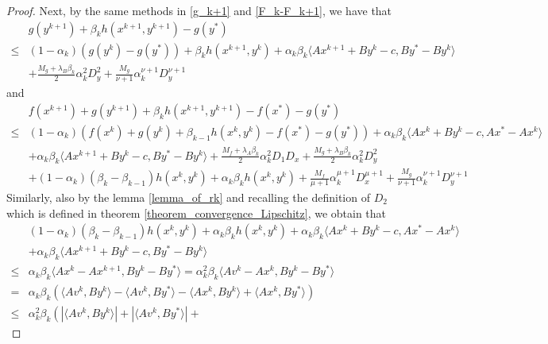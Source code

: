 \documentclass{article}
\numberwithin{equation}{section}
\begin{document}
\begin{proof}
    Next, by the same methods in \eqref{g_k+1} and \eqref{F_k-F_k+1}, we have that 
    \begin{align}
         &g(y^{k+1}) +\beta_{k}h(x^{k+1},y^{k+1}) -g(y^*)  \nonumber \\
        \leq& (1-\alpha_k)(g(y^k)-g(y^*))+\beta_{k}h(x^{k+1},y^k)+ \alpha_k\beta_{k}\langle Ax^{k+1} +By^k -c, By^* -By^k\rangle  \nonumber \\
        &+\frac{M_g+\lambda_{B} \beta_{k}}{2} \alpha_k^2 D_y^2 +\frac{M_g}{\nu+1}\alpha_k^{\nu +1}D_y^{\nu+1} \label{g_k+1_holder}
    \end{align}
    and
    \begin{align}
        &f(x^{k+1}) +g(y^{k+1}) +\beta_{k}h(x^{k+1},y^{k+1}) -f(x^*) -g(y^*) \nonumber \\
        \leq& (1-\alpha_k)\left(f(x^k) +g(y^k)+\beta_{k-1}h(x^k,y^k) -f(x^*)-g(y^*)\right)+\alpha_k\beta_{k}\langle Ax^k+By^k-c,Ax^*-Ax^k\rangle \nonumber \\
        &+ \alpha_k\beta_{k}\langle Ax^{k+1} +By^k -c, By^* -By^k\rangle +\frac{M_f+\lambda_{A} \beta_{k}}{2}\alpha_k^2D_1D_x+ \frac{M_g +\lambda_{B} \beta_{k}}{2}\alpha_k^2D_y^2
        \nonumber \\
        & +(1-\alpha_k)(\beta_{k}-\beta_{k-1})h(x^k,y^k) + \alpha_k\beta_{k} h(x^k,y^k) +\frac{M_f}{\mu+1}\alpha_k^{\mu +1}D_x^{\mu+1} +\frac{M_g}{\nu+1}\alpha_k^{\nu +1}D_y^{\nu+1} \label{F_k-F_k+1_holder}
    \end{align}
    Similarly, also by the lemma \ref{lemma_of_rk} and recalling the definition of $D_2$ which is defined in theorem \ref{theorem_convergence_Lipschitz}, 
    we obtain that 
    \begin{align}
        &(1-\alpha_k)(\beta_{k}-\beta_{k-1})h(x^k,y^k) + \alpha_k \beta_{k}h(x^k,y^k) + \alpha_k\beta_{k}\langle Ax^k+By^k-c,Ax^*-Ax^k\rangle \nonumber\\
        &+ \alpha_k\beta_{k}\langle Ax^{k+1} +By^k -c, By^* -By^k\rangle \nonumber \\
        \overset{\mathop{(a)}}{\leq}& \alpha_k\beta_{k} \langle Ax^k -Ax^{k+1}, By^k-By^*\rangle \nonumber  
        =\alpha_k^2\beta_k \langle Av^k -Ax^k,By^k-By^* \rangle  \nonumber \\
        =& \alpha_k\beta_k \left(\langle Av^k,By^k \rangle-\langle Av^k, By^*\rangle - 
        \langle Ax^{k},By^k \rangle+ \langle Ax^{k}, By^* \rangle\right)  \nonumber \\
        \leq& \alpha_k^2\beta_k \left(\left|\langle Av^k,By^k \rangle \right|+\left|\langle Av^k, By^*\rangle\right| + 

\end{align}
\end{proof}
\end{document}
